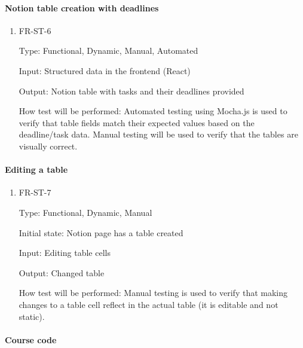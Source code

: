 \documentclass[12pt, titlepage]{article}
\begin{document}
\paragraph{Notion table creation with deadlines}

\begin{enumerate}

\item{FR-ST-6\\}

Type: Functional, Dynamic, Manual, Automated 

Input: Structured data in the frontend (React) 

Output: Notion table with tasks and their deadlines provided 

How test will be performed: Automated testing using Mocha.js is used to verify that table fields match their expected values based on the deadline/task data. Manual testing will be used to verify that the tables are visually correct. 

\end{enumerate}

\paragraph{Editing a table}

\begin{enumerate}

\item{FR-ST-7\\}

Type: Functional, Dynamic, Manual 

Initial state: Notion page has a table created 

Input: Editing table cells 

Output: Changed table 

How test will be performed: Manual testing is used to verify that making changes to a table cell reflect in the actual table (it is editable and not static).

\end{enumerate}

\paragraph{Course code}
\end{document}
